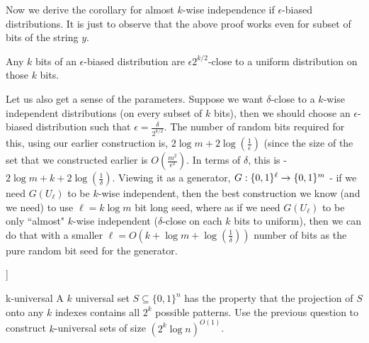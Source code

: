 Now we derive the corollary for almost $k$-wise independence if $\epsilon$-biased distributions. It is just to observe that the above proof works even for subset of bits of the string $y$.

\begin{corollary}
Any $k$ bits of an $\epsilon$-biased distribution are $\epsilon 2^{k/2}$-close to a uniform distribution on those $k$ bits.
\end{corollary}

Let us also get a sense of the parameters. Suppose we want $\delta$-close to a $k$-wise independent distributions (on every subset of $k$ bits), then we should choose an $\epsilon$-biased distribution such that $\epsilon = \frac{\delta}{2^{k/2}}$. The number of random bits required for this, using our earlier construction is, $2 \log m + 2 \log \left( \frac{1}{\epsilon} \right)$ (since the size of the set that we constructed earlier is $O\left( \frac{m^2}{\epsilon^2} \right)$.
In terms of $\delta$, this is - $2 \log m + k + 2 \log\left(\frac{1}{\delta} \right)$. Viewing it as a generator, $G : \{0,1\}^\ell \to \{0,1\}^m$ - if we need $G(U_\ell)$ to be $k$-wise independent, then the best construction we know (and we need) to use $\ell = k \log m$ bit long seed, where as if we need $G(U_\ell)$ to be only ``almost" $k$-wise independent ($\delta$-close on each $k$ bits to uniform), then we can do that with a smaller $\ell = O\left( k+\log m+\log\left( \frac{1}{\delta} \right)\right)$ number of bits as the pure random bit seed for the generator.

\begin{exercise-prob}]
\begin{show-ps4}{k-universal}
A $k$ universal set $S \subseteq \{0,1\}^n$ has the property that the projection of $S$ onto any $k$ indexes contains all $2^k$ possible patterns. Use the previous question to construct $k$-universal sets of size $\left( 2^k \log n \right)^{O(1)}$.
\end{show-ps4}
\end{exercise-prob}
